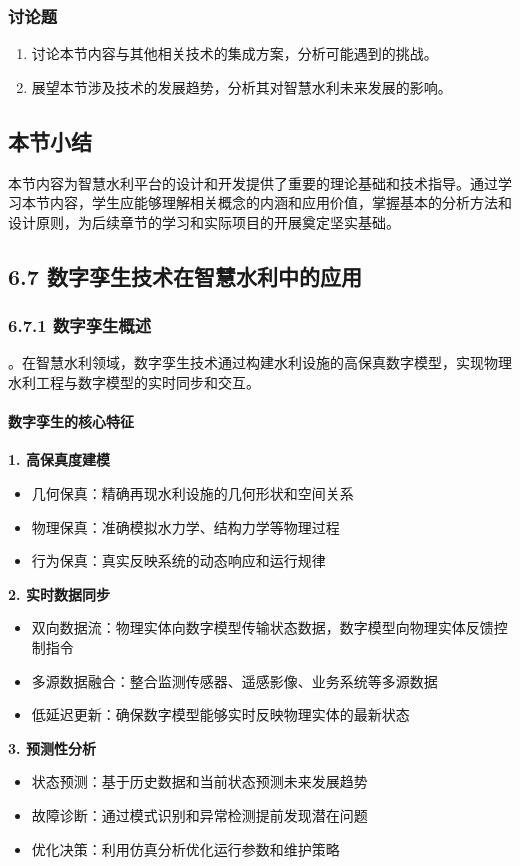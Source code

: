 {{{{{{{{{{\subsubsection{讨论题}\label{ux8ba8ux8bbaux9898-6} \begin{enumerate} \def\labelenumi{\arabic{enumi}.} \tightlist \item
讨论本节内容与其他相关技术的集成方案，分析可能遇到的挑战。 \item 展望本节涉及技术的发展趋势，分析其对智慧水利未来发展的影响。 \end{enumerate}
\subsection{本节小结}\label{ux672cux8282ux5c0fux7ed3-5}
本节内容为智慧水利平台的设计和开发提供了重要的理论基础和技术指导。通过学习本节内容，学生应能够理解相关概念的内涵和应用价值，掌握基本的分析方法和设计原则，为后续章节的学习和实际项目的开展奠定坚实基础。 \subsection{6.7
数字孪生技术在智慧水利中的应用}\label{ux6570ux5b57ux5b6aux751fux6280ux672fux5728ux667aux6167ux6c34ux5229ux4e2dux7684ux5e94ux7528}
\subsubsection{6.7.1 数字孪生概述}\label{ux6570ux5b57ux5b6aux751fux6982ux8ff0}
。在智慧水利领域，数字孪生技术通过构建水利设施的高保真数字模型，实现物理水利工程与数字模型的实时同步和交互。
\paragraph{数字孪生的核心特征}\label{ux6570ux5b57ux5b6aux751fux7684ux6838ux5fc3ux7279ux5f81} \textbf{1. 高保真度建模} \begin{itemize}
\tightlist \item 几何保真：精确再现水利设施的几何形状和空间关系 \item 物理保真：准确模拟水力学、结构力学等物理过程 \item 行为保真：真实反映系统的动态响应和运行规律 \end{itemize}
\textbf{2. 实时数据同步} \begin{itemize} \tightlist \item 双向数据流：物理实体向数字模型传输状态数据，数字模型向物理实体反馈控制指令 \item
多源数据融合：整合监测传感器、遥感影像、业务系统等多源数据 \item 低延迟更新：确保数字模型能够实时反映物理实体的最新状态 \end{itemize} \textbf{3. 预测性分析} \begin{itemize}
\tightlist \item 状态预测：基于历史数据和当前状态预测未来发展趋势 \item 故障诊断：通过模式识别和异常检测提前发现潜在问题 \item 优化决策：利用仿真分析优化运行参数和维护策略 \end{itemize}
}}}}}}}}}}
